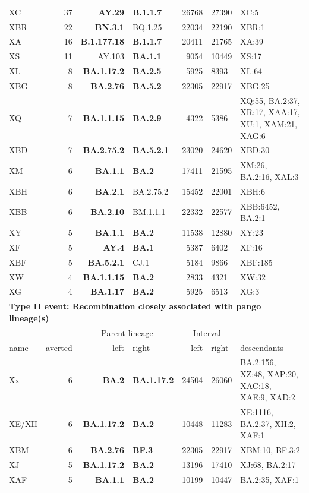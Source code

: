 \documentclass[12pt]{article}
\begin{document}
\begin{table}
\begin{scriptsize}
\begin{tabular}{lrrlrll}
XC & 37 & \textbf{AY.29} & \textbf{B.1.1.7} & 26768 & 27390 & {XC:5} \\
XBR & 22 & \textbf{BN.3.1} & BQ.1.25 & 22034 & 22190 & {XBR:1} \\
XA & 16 & \textbf{B.1.177.18} & \textbf{B.1.1.7} & 20411 & 21765 & {XA:39} \\
XS & 11 & AY.103 & \textbf{BA.1.1} & 9054 & 10449 & {XS:17} \\
XL & 8 & \textbf{BA.1.17.2} & \textbf{BA.2.5} & 5925 & 8393 & {XL:64} \\
XBG & 8 & \textbf{BA.2.76} & \textbf{BA.5.2} & 22305 & 22917 & {XBG:25} \\
XQ & 7 & \textbf{BA.1.1.15} & \textbf{BA.2.9} & 4322 & 5386 & {XQ:55, BA.2:37,
XR:17, XAA:17, XU:1, XAM:21, XAG:6} \\
XBD & 7 & \textbf{BA.2.75.2} & \textbf{BA.5.2.1} & 23020 & 24620 & {XBD:30} \\
XM & 6 & \textbf{BA.1.1} & \textbf{BA.2} & 17411 & 21595 & {XM:26, BA.2:16,
XAL:3} \\
XBH & 6 & \textbf{BA.2.1} & BA.2.75.2 & 15452 & 22001 & {XBH:6} \\
XBB & 6 & \textbf{BA.2.10} & BM.1.1.1 & 22332 & 22577 & {XBB:6452, BA.2:1} \\
XY & 5 & \textbf{BA.1.1} & \textbf{BA.2} & 11538 & 12880 & {XY:23} \\
XF & 5 & \textbf{AY.4} & \textbf{BA.1} & 5387 & 6402 & {XF:16} \\
XBF & 5 & \textbf{BA.5.2.1} & CJ.1 & 5184 & 9866 & {XBF:185} \\
XW & 4 & \textbf{BA.1.1.15} & \textbf{BA.2} & 2833 & 4321 & {XW:32} \\
XG & 4 & \textbf{BA.1.17} & \textbf{BA.2} & 5925 & 6513 & {XG:3} \\


\midrule
\multicolumn{7}{l}{\textbf{Type II event: Recombination closely associated with
pango lineage(s)}}\\
&&\multicolumn{2}{c}{Parent lineage} & \multicolumn{2}{c}{Interval}\\
name & averted & left & right & left & right & descendants \\
\midrule

Xx & 6 & \textbf{BA.2} & \textbf{BA.1.17.2} & 24504 & 26060 & {BA.2:156, XZ:48,
XAP:20, XAC:18, XAE:9, XAD:2} \\
XE/XH & 6 & \textbf{BA.1.17.2} & \textbf{BA.2} & 10448 & 11283 & {XE:1116,
BA.2:37, XH:2, XAF:1} \\
XBM & 6 & \textbf{BA.2.76} & \textbf{BF.3} & 22305 & 22917 & {XBM:10, BF.3:2}
\\
XJ & 5 & \textbf{BA.1.17.2} & \textbf{BA.2} & 13196 & 17410 & {XJ:68, BA.2:17}
\\
XAF & 5 & \textbf{BA.1.1} & \textbf{BA.2} & 10199 & 10447 & {BA.2:35, XAF:1} \\


\end{tabular}
\end{scriptsize}
\end{table}
\end{document}
